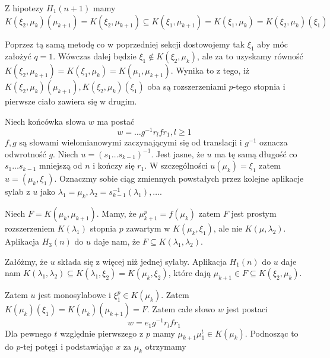 Z hipotezy $H_1(n+1)$ mamy
\[
  K\left(\xi_2, \mu_k\right) \left(\mu_{k+1}\right)
  =
  K\left(\xi_2, \mu_{k+1}\right)
  \subseteq
  K\left(\xi_1, \mu_{k+1}\right)
  =
  K\left(\xi_1, \mu_{k}\right)
  =
  K\left(\xi_2, \mu_{k}\right)\left(\xi_1\right)
\]

Poprzez tą samą metodę co w poprzedniej sekcji dostowojemy tak $\xi_1$ aby móc
założyć $q = 1$. Wówczas dalej będzie $\xi_1 \not \in K\left(\xi_2,
\mu_k\right)$, ale za to uzyskamy równość
$K\left(\xi_2, \mu_{k+1}\right)
= K\left(\xi_1, \mu_k\right)
= K\left(\mu_1, \mu_{k+1}\right)$. Wynika to z tego, iż
$
K\left(\xi_2, \mu_{k}\right) \left(\mu_{k+1}\right),
K\left(\xi_2, \mu_{k}\right) \left(\xi_{1}\right)$ oba są rozszerzeniami
$p$-tego stopnia i pierwsze ciało zawiera się w drugim.

Niech końcówka słowa $w$ ma postać
\begin{equation}
w = \ldots g^{-1}r_lfr_1, l \geq 1
\label{eq:h_2_w_ending}
\end{equation}
$f, g$ są słowami wielomianowymi zaczynającymi się od translacji i $g^{-1}$
oznacza odwrotność $g$. Niech $u = \left(s_1 \ldots s_{k-1}\right)^{-1}$. Jest
jasne, że $u$ ma tę samą długość co $s_1\ldots s_{k-1}$ mniejszą od $n$ i kończy
się $r_1$. W szczególności $u\left(\mu_k\right) = \xi_1$ zatem $u = \left(\mu_k,
\xi_1\right)$. Oznaczmy sobie ciąg zmiennych powstałych przez kolejne aplikacje
sylab z $u$ jako $\lambda_1 = \mu_k, \lambda_2 =
s_{k-1}^{-1}\left(\lambda_1\right), \ldots$.

Niech $F = K \left(\mu_k, \mu_{k+1}\right)$. Mamy, że
$\mu_{k+1}^p = f\left(\mu_k\right)$ zatem $F$ jest prostym rozszerzeniem
$K\left(\lambda_1 \right)$ stopnia $p$ zawartym w $K \left( \mu_k, \xi_1
\right)$, ale nie $K \left(\mu, \lambda_2 \right)$.
Aplikacja $H_3(n)$ do $u$ daje nam, że $F \subseteq K \left( \lambda_1,
\lambda_2 \right)$.

Załóżmy, że $u$ składa się z więcej niż jednej sylaby. Aplikacja $H_1(n)$ do $u$
daje nam
$K \left( \lambda_1, \lambda_2 \right) \subseteq K \left( \lambda_1, \xi_2
\right) = K \left( \mu_k, \xi_2 \right)$, które dają $\mu_{k+1} \in F \subseteq
K \left( \xi_2, \mu_k \right)$.

Zatem $u$ jest monosylabowe i $\xi_1^p \in K \left( \mu_k\right)$. Zatem
$K \left( \mu_k \right) \left(\xi_1 \right) = K \left(\mu_k \right)
\left(\mu_{k+1} \right) = F$. Zatem całe słowo $w$ jest postaci
\[w = e_1 g^{-1}r_lfr_1\]
Dla pewnego $t$ względnie pierwszego z $p$ mamy $\mu_{k+1} \mu_1^t \in K \left(
\mu_k \right)$.  Podnosząc to do $p$-tej potęgi i podstawiając $x$ za $\mu_k$
otrzymamy

